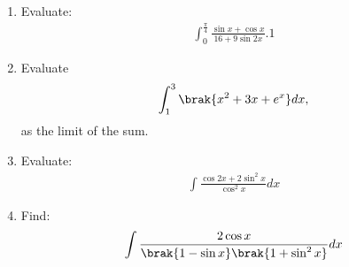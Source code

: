 \begin{enumerate}
\item Evaluate: 
\begin{align*}
	\int_{0}^{\frac{\pi}{4}}\frac{\sin x+\cos x}{16+9 \sin 2x}.1
\end{align*}
\item Evaluate 
	\begin{align*}
		\int_{1}^{3} \brak{x^{2}+3x+e^{x}}dx,
	\end{align*}
	as the limit of the sum.
\item Evaluate:
			\begin{align*}
			\int\frac{\cos 2x+2\sin^{2}x}{\cos^{2}x}dx
				\end{align*}
\item Find:
	\begin{align*}
		\int\frac{2\cos x}{\brak{1-\sin x}\brak{1+\sin^{2}x}}dx
	\end{align*}
 

\end{enumerate}
